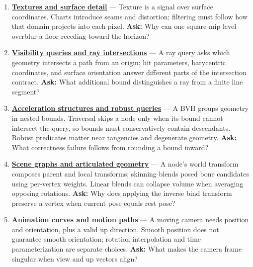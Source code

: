 \begin{enumerate}
\item
  \textbf{\href{Continuous\%20Notes/University\%20-\%20Worlds,\%20Images\%20and\%20Inference\%20-\%20Graphics,\%20Vision\%20and\%20Photography\#Textures\%20and\%20surface\%20detail}{Textures and surface detail}} --- Texture is a signal over surface coordinates. Charts introduce seams and distortion; filtering must follow how that domain projects into each pixel. \textbf{Ask:} Why can one square mip level overblur a floor receding toward the horizon?
\item
  \textbf{\href{Continuous\%20Notes/University\%20-\%20Worlds,\%20Images\%20and\%20Inference\%20-\%20Graphics,\%20Vision\%20and\%20Photography\#Visibility\%20queries\%20and\%20ray\%20intersections}{Visibility queries and ray intersections}} --- A ray query asks which geometry intersects a path from an origin; hit parameters, barycentric coordinates, and surface orientation answer different parts of the intersection contract. \textbf{Ask:} What additional bound distinguishes a ray from a finite line segment?
\item
  \textbf{\href{Continuous\%20Notes/University\%20-\%20Worlds,\%20Images\%20and\%20Inference\%20-\%20Graphics,\%20Vision\%20and\%20Photography\#Acceleration\%20structures\%20and\%20robust\%20queries}{Acceleration structures and robust queries}} --- A BVH groups geometry in nested bounds. Traversal skips a node only when its bound cannot intersect the query, so bounds must conservatively contain descendants. Robust predicates matter near tangencies and degenerate geometry. \textbf{Ask:} What correctness failure follows from rounding a bound inward?
\item
  \textbf{\href{Continuous\%20Notes/University\%20-\%20Worlds,\%20Images\%20and\%20Inference\%20-\%20Graphics,\%20Vision\%20and\%20Photography\#Scene\%20graphs\%20and\%20articulated\%20geometry}{Scene graphs and articulated geometry}} --- A node's world transform composes parent and local transforms; skinning blends posed bone candidates using per-vertex weights. Linear blends can collapse volume when averaging opposing rotations. \textbf{Ask:} Why does applying the inverse bind transform preserve a vertex when current pose equals rest pose?
\item
  \textbf{\href{Continuous\%20Notes/University\%20-\%20Worlds,\%20Images\%20and\%20Inference\%20-\%20Graphics,\%20Vision\%20and\%20Photography\#Animation\%20curves\%20and\%20motion\%20paths}{Animation curves and motion paths}} --- A moving camera needs position and orientation, plus a valid up direction. Smooth position does not guarantee smooth orientation; rotation interpolation and time parameterization are separate choices. \textbf{Ask:} What makes the camera frame singular when view and up vectors align?

\end{enumerate}
